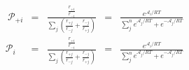 \begin{eqnarray}\
{\mathcal P}_{+i}  & = & \frac{\frac{r_{+i}}{r_{-i}}}{\sum_j\left(\frac{r_{+j}}{r_{-j}} + \frac{r_{-j}}{r_{+j}}  \right)} & = & \frac{e^{\mathcal A_i/RT}}{\sum_j^n e^{\mathcal A_j/RT} + e^{-\mathcal A_j/RT}} \\
{\mathcal P}_{i}  & = & \frac{\frac{r_{+i}}{r_{-i}}}{\sum_j\left(\frac{r_{+j}}{r_{-j}} + \frac{r_{-j}}{r_{+j}}  \right)} & = & \frac{e^{\mathcal A_i/RT}}{\sum_j^n e^{\mathcal A_j/RT} + e^{-\mathcal A_j/RT}} \\
\end{eqnarray}